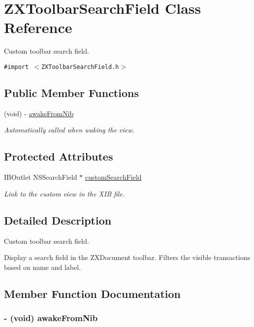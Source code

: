 \hypertarget{interface_z_x_toolbar_search_field}{
\section{ZXToolbarSearchField Class Reference}
\label{interface_z_x_toolbar_search_field}
}
Custom toolbar search field.  


{\tt \#import $<$ZXToolbarSearchField.h$>$}

\subsection*{Public Member Functions}
\begin{CompactItemize}
\item 
(void) - \hyperlink{interface_z_x_toolbar_search_field_5aea36bc75831040296d9d207f9a4a6b}{awakeFromNib}
\begin{CompactList}\small\item\em Automatically called when waking the view. \item\end{CompactList}\end{CompactItemize}
\subsection*{Protected Attributes}
\begin{CompactItemize}
\item 
IBOutlet NSSearchField $\ast$ \hyperlink{interface_z_x_toolbar_search_field_74f14a544b5f8091173aca4926615f0c}{customSearchField}
\begin{CompactList}\small\item\em Link to the custom view in the XIB file. \item\end{CompactList}\end{CompactItemize}


\subsection{Detailed Description}
Custom toolbar search field. 

Display a search field in the ZXDocument toolbar. Filters the visible transactions based on name and label. 

\subsection{Member Function Documentation}
\hypertarget{interface_z_x_toolbar_search_field_5aea36bc75831040296d9d207f9a4a6b}{
\subsubsection[{awakeFromNib}]{\setlength{\rightskip}{0pt plus 5cm}- (void) awakeFromNib }}
\label{interface_z_x_toolbar_search_field_5aea36bc75831040296d9d207f9a4a6b}



